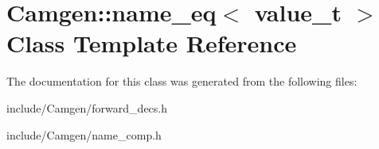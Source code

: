 \hypertarget{a00378}{\section{Camgen\-:\-:name\-\_\-eq$<$ value\-\_\-t $>$ Class Template Reference}
\label{a00378}
}


The documentation for this class was generated from the following files\-:\begin{DoxyCompactItemize}
\item 
include/\-Camgen/forward\-\_\-decs.\-h\item 
include/\-Camgen/name\-\_\-comp.\-h\end{DoxyCompactItemize}
